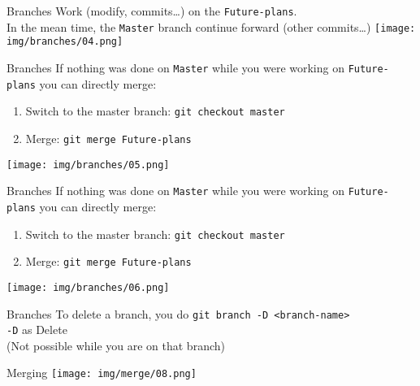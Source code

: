 \documentclass[usenames,dvipsnames,handout,9pt]{beamer}
\begin{document}
\begin{frame}{Branches}
Work (modify, commits\ldots) on the \texttt{Future-plans}.\\
In the mean time, the \texttt{Master} branch continue forward (other commits\ldots)
\texttt{[image: img/branches/04.png]}
\end{frame}


\begin{frame}{Branches}
If nothing was done on \texttt{Master} while you were working on \texttt{Future-plans} you can directly merge:
\begin{enumerate}
  \item Switch to the master branch: \lstinline|git checkout master|
  \item Merge: \lstinline|git merge Future-plans|
\end{enumerate}
\vspace{-1cm}
\texttt{[image: img/branches/05.png]}
\end{frame}

\begin{frame}{Branches}
\vspace{0.2cm}
If nothing was done on \texttt{Master} while you were working on \texttt{Future-plans} you can directly merge:
\begin{enumerate}
  \item Switch to the master branch: \lstinline|git checkout master|
  \item Merge: \lstinline|git merge Future-plans|
\end{enumerate}
\vspace{-0.8cm}
\hspace{0.07cm}\texttt{[image: img/branches/06.png]}
\end{frame}

\begin{frame}{Branches}
  \centering
  To delete a branch, you do \lstinline|git branch -D <branch-name>|\\
  \lstinline|-D| as Delete\\
  (Not possible while you are on that branch)
\end{frame}



%
%

\begin{frame}{Merging}
\texttt{[image: img/merge/08.png]}
\end{frame}
\end{document}
